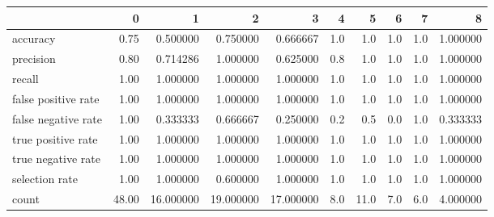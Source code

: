 \begin{tabular}{lrrrrrrrrr}
\toprule
{} &      0 &          1 &          2 &          3 &    4 &     5 &    6 &    7 &         8 \\
\midrule
accuracy            &   0.75 &   0.500000 &   0.750000 &   0.666667 &  1.0 &   1.0 &  1.0 &  1.0 &  1.000000 \\
precision           &   0.80 &   0.714286 &   1.000000 &   0.625000 &  0.8 &   1.0 &  1.0 &  1.0 &  1.000000 \\
recall              &   1.00 &   1.000000 &   1.000000 &   1.000000 &  1.0 &   1.0 &  1.0 &  1.0 &  1.000000 \\
false positive rate &   1.00 &   1.000000 &   1.000000 &   1.000000 &  1.0 &   1.0 &  1.0 &  1.0 &  1.000000 \\
false negative rate &   1.00 &   0.333333 &   0.666667 &   0.250000 &  0.2 &   0.5 &  0.0 &  1.0 &  0.333333 \\
true positive rate  &   1.00 &   1.000000 &   1.000000 &   1.000000 &  1.0 &   1.0 &  1.0 &  1.0 &  1.000000 \\
true negative rate  &   1.00 &   1.000000 &   1.000000 &   1.000000 &  1.0 &   1.0 &  1.0 &  1.0 &  1.000000 \\
selection rate      &   1.00 &   1.000000 &   0.600000 &   1.000000 &  1.0 &   1.0 &  1.0 &  1.0 &  1.000000 \\
count               &  48.00 &  16.000000 &  19.000000 &  17.000000 &  8.0 &  11.0 &  7.0 &  6.0 &  4.000000 \\
\bottomrule
\end{tabular}
